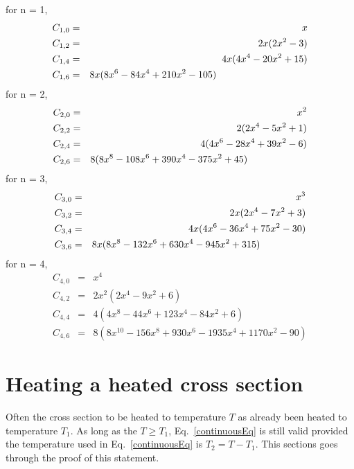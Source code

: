 \documentclass[11pt,twoside]{article}
\begin{document}
for n = 1,
\begin{eqnarray}  \label{C1is}
    C_{1,0} & = &   x \nonumber \\
    C_{1,2} & = & 2 x ( 2 x^2 - 3 ) \nonumber \\
    C_{1,4} & = & 4 x ( 4 x^4 - 20 x^2 + 15 ) \nonumber \\
    C_{1,6} & = & 8 x ( 8 x^6 - 84 x^4 + 210 x^2 - 105 )            \hspace{1.3in}
\end{eqnarray}
for n = 2,
\begin{eqnarray}  \label{C2is}
    C_{2,0} & = & x^2 \nonumber \\
    C_{2,2} & = & 2 ( 2 x^4 - 5 x^2 + 1 ) \nonumber \\
    C_{2,4} & = & 4 ( 4 x^6 - 28 x^4 + 39 x^2 - 6 ) \nonumber \\
    C_{2,6} & = & 8 ( 8 x^8 - 108 x^6 + 390 x^4 - 375 x^2 + 45 )    \hspace{0.85in}
\end{eqnarray}
for n = 3,
\begin{eqnarray}  \label{C3is}
    C_{3,0} & = & x^3 \nonumber \\
    C_{3,2} & = & 2 x ( 2 x^4 - 7 x^2 + 3 ) \nonumber \\
    C_{3,4} & = & 4 x ( 4 x^6 - 36 x^4 + 75 x^2 - 30 ) \nonumber \\
    C_{3,6} & = & 8 x ( 8 x^8 - 132 x^6 + 630 x^4 - 945 x^2 + 315 ) \hspace{.65in}
\end{eqnarray}
for n = 4,
\begin{eqnarray}  \label{C4is}
    C_{4,0} & = & x^4 \nonumber \\
    C_{4,2} & = & 2 x^2 ( 2 x^4 - 9 x^2 + 6 ) \nonumber \\
    C_{4,4} & = & 4 ( 4 x^8 - 44 x^6 + 123 x^4 - 84 x^2 + 6 ) \nonumber \\
    C_{4,6} & = & 8 ( 8 x^{10} - 156 x^8 + 930 x^6 - 1935 x^4 + 1170 x^2 - 90 )
\end{eqnarray}

\section{Heating a heated cross section} \label{HeatingHeated}
Often the cross section to be heated to temperature $T$ as already been heated to temperature $T_1$. As long as the $T \ge T_1$,
Eq.~\ref{continuousEq} is still valid provided~\cite{RedC} the temperature used in Eq.~\ref{continuousEq} is $T_2 = T - T_1$. 
This sections goes through the proof of this statement.
\end{document}
